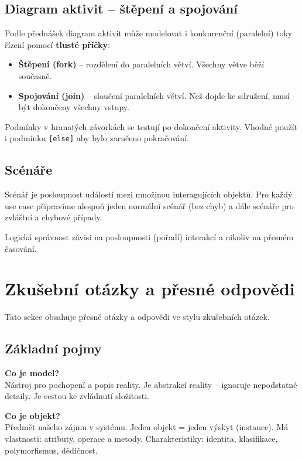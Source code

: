 \documentclass[12pt, a4paper]{article}
\begin{document}
\subsection{Diagram aktivit -- štěpení a spojování}

Podle přednášek diagram aktivit může modelovat i konkurenční (paralelní) toky řízení pomocí \textbf{tlusté příčky}:
\begin{itemize}
  \item \textbf{Štěpení (fork)} -- rozdělení do paralelních větví. Všechny větve běží současně.
  \item \textbf{Spojování (join)} -- sloučení paralelních větví. Než dojde ke sdružení, musí být dokončeny všechny vstupy.
\end{itemize}

Podmínky v hranatých závorkách se testují po dokončení aktivity. Vhodné použít i podmínku \texttt{[else]} aby bylo zaručeno pokračování.

\subsection{Scénáře}

Scénář je posloupnost událostí mezi množinou interagujících objektů. Pro každý use case připravíme alespoň jeden normální scénář (bez chyb) a dále scénáře pro zvláštní a chybové případy.

Logická správnost závisí na posloupnosti (pořadí) interakcí a nikoliv na přesném časování.


\section{Zkušební otázky a přesné odpovědi}

Tato sekce obsahuje přesné otázky a odpovědi ve stylu zkušebních otázek.

\subsection{Základní pojmy}

\textbf{Co je model?}\\
Nástroj pro pochopení a popis reality. Je abstrakcí reality -- ignoruje nepodstatné detaily. Je cestou ke zvládnutí složitosti.

\textbf{Co je objekt?}\\
Předmět našeho zájmu v systému. Jeden objekt = jeden výskyt (instance). Má vlastnosti: atributy, operace a metody. Charakteristiky: identita, klasifikace, polymorfismus, dědičnost.
\end{document}
